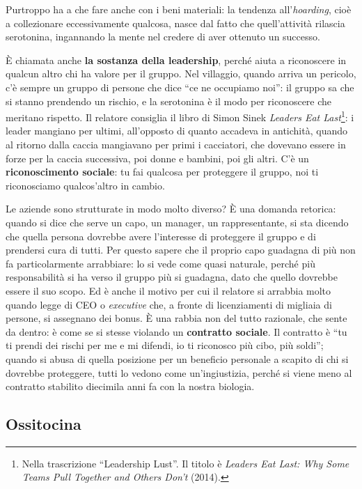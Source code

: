 Purtroppo ha a che fare anche con i beni materiali: la tendenza all'\emph{hoarding}, cioè a
collezionare eccessivamente qualcosa, nasce dal fatto che quell'attività rilascia serotonina,
ingannando la mente nel credere di aver ottenuto un successo.

È chiamata anche \textbf{la sostanza della leadership}, perché aiuta a riconoscere in qualcun
altro chi ha valore per il gruppo. Nel villaggio, quando arriva un pericolo, c'è sempre un
gruppo di persone che dice ``ce ne occupiamo noi'': il gruppo sa che si stanno prendendo un
rischio, e la serotonina è il modo per riconoscere che meritano rispetto. Il relatore consiglia
il libro di Simon Sinek \emph{Leaders Eat Last}\footnote{Nella trascrizione ``Leadership
Lust''. Il titolo è \emph{Leaders Eat Last: Why Some Teams Pull Together and Others Don't}
(2014).}: i leader mangiano per ultimi,
all'opposto di quanto accadeva in antichità, quando al ritorno dalla caccia mangiavano per
primi i cacciatori, che dovevano essere in forze per la caccia successiva, poi donne e
bambini, poi gli altri. C'è un \textbf{riconoscimento sociale}: tu fai qualcosa per proteggere
il gruppo, noi ti riconosciamo qualcos'altro in cambio.

Le aziende sono strutturate in modo molto diverso? È una domanda retorica: quando si dice che
serve un capo, un manager, un rappresentante, si sta dicendo che quella persona dovrebbe avere
l'interesse di proteggere il gruppo e di prendersi cura di tutti. Per questo sapere che il
proprio capo guadagna di più non fa particolarmente arrabbiare: lo si vede come quasi naturale,
perché più responsabilità si ha verso il gruppo più si guadagna, dato che quello dovrebbe essere
il suo scopo. Ed è anche il motivo per cui il relatore si arrabbia molto quando legge di CEO o
\emph{executive} che, a fronte di licenziamenti di migliaia di persone, si assegnano dei bonus.
È una rabbia non del tutto razionale, che sente da dentro: è come se si stesse violando un
\textbf{contratto sociale}. Il contratto è ``tu ti prendi dei rischi per me e mi difendi, io ti
riconosco più cibo, più soldi''; quando si abusa di quella posizione per un beneficio personale
a scapito di chi si dovrebbe proteggere, tutti lo vedono come un'ingiustizia, perché si viene
meno al contratto stabilito diecimila anni fa con la nostra biologia.

\subsection{Ossitocina}

